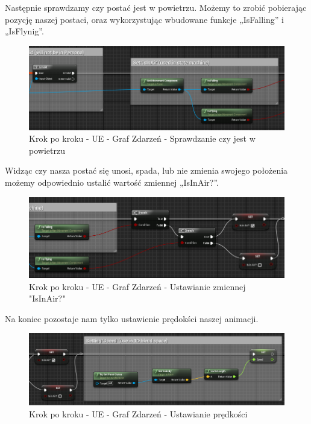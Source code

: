 \documentclass[12pt]{xmgr}
\begin{document}
Następnie sprawdzamy czy postać jest w powietrzu. Możemy to zrobić pobierając pozycję naszej postaci, oraz wykorzystując wbudowane funkcje „IsFalling” i „IsFlynig”.

\begin{figure}[!htb]
    \begin{center}
    \includegraphics[scale=0.6]{Screeny/UeKrokPoKroku/UE-EventGraph-IsInAir.png}
    \end{center}
    \caption{Krok po kroku - UE -  Graf Zdarzeń - Sprawdzanie czy jest w powietrzu}
\end{figure}

Widząc czy nasza postać się unosi, spada, lub nie zmienia swojego położenia możemy odpowiednio ustalić wartość zmiennej „IsInAir?”.
\newpage
\begin{figure}[!htb]
    \begin{center}
    \includegraphics[scale=0.6]{Screeny/UeKrokPoKroku/UE-EventGraph-SetIsInAir.png}
    \end{center}
    \caption{Krok po kroku - UE -  Graf Zdarzeń - Ustawianie zmiennej "IsInAir?"}
\end{figure}

Na koniec pozostaje nam tylko ustawienie prędokści naszej animacji.

\begin{figure}[!htb]
    \begin{center}
    \includegraphics[scale=0.6]{Screeny/UeKrokPoKroku/UE-EventGraph-Speed.png}
    \end{center}
    \caption{Krok po kroku - UE -  Graf Zdarzeń - Ustawianie prędkości}
\end{figure}
\end{document}
